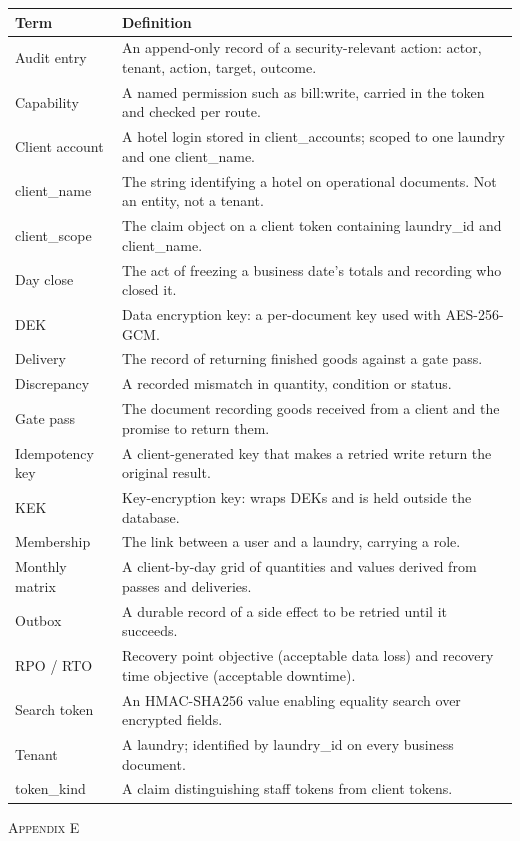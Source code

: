 \documentclass[11pt,a4paper,oneside]{book}
\begin{document}
\begin{center}\small
\begin{tabularx}{\linewidth}{|X|X|}
\hline
\rowcolor{lightgrey}
\textbf{Term} & \textbf{Definition} \\ \hline
Audit entry & An append-only record of a security-relevant action: actor, tenant, action, target, outcome. \\ \hline
Capability & A named permission such as bill:write, carried in the token and checked per route. \\ \hline
Client account & A hotel login stored in client\_accounts; scoped to one laundry and one client\_name. \\ \hline
client\_name & The string identifying a hotel on operational documents. Not an entity, not a tenant. \\ \hline
client\_scope & The claim object on a client token containing laundry\_id and client\_name. \\ \hline
Day close & The act of freezing a business date's totals and recording who closed it. \\ \hline
DEK & Data encryption key: a per-document key used with AES-256-GCM. \\ \hline
Delivery & The record of returning finished goods against a gate pass. \\ \hline
Discrepancy & A recorded mismatch in quantity, condition or status. \\ \hline
Gate pass & The document recording goods received from a client and the promise to return them. \\ \hline
Idempotency key & A client-generated key that makes a retried write return the original result. \\ \hline
KEK & Key-encryption key: wraps DEKs and is held outside the database. \\ \hline
Membership & The link between a user and a laundry, carrying a role. \\ \hline
Monthly matrix & A client-by-day grid of quantities and values derived from passes and deliveries. \\ \hline
Outbox & A durable record of a side effect to be retried until it succeeds. \\ \hline
RPO / RTO & Recovery point objective (acceptable data loss) and recovery time objective (acceptable downtime). \\ \hline
Search token & An HMAC-SHA256 value enabling equality search over encrypted fields. \\ \hline
Tenant & A laundry; identified by laundry\_id on every business document. \\ \hline
token\_kind & A claim distinguishing staff tokens from client tokens. \\ \hline
\end{tabularx}
\end{center}
\textsc{\small\color{crimson}Appendix E}\par\medskip
\end{document}
